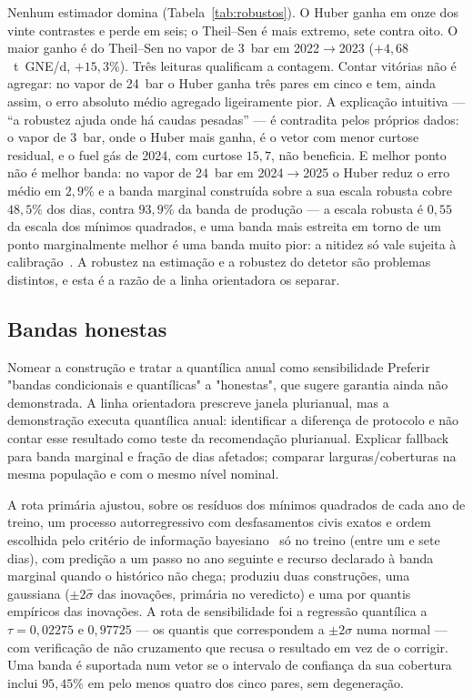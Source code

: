 Nenhum estimador domina (Tabela~\ref{tab:robustos}). O Huber ganha em onze
dos vinte contrastes e perde em seis; o Theil--Sen é mais extremo, sete
contra oito. O maior ganho é do Theil--Sen no vapor de 3~bar em
2022${\to}$2023 ($+4{,}68$~t~GNE/d, $+15{,}3\%$). Três leituras
qualificam a contagem. Contar vitórias não é agregar: no vapor de 24~bar o
Huber ganha três pares em cinco e tem, ainda assim, o erro absoluto médio
agregado ligeiramente pior. A explicação intuitiva --- ``a robustez ajuda
onde há caudas pesadas'' --- é contradita pelos próprios dados: o vapor de
3~bar, onde o Huber mais ganha, é o vetor com menor curtose residual, e o
fuel gás de 2024, com curtose $15{,}7$, não beneficia. E melhor ponto não é
melhor banda: no vapor de 24~bar em 2024${\to}$2025 o Huber reduz o erro
médio em $2{,}9\%$ e a banda marginal construída sobre a sua escala robusta
cobre $48{,}5\%$ dos dias, contra $93{,}9\%$ da banda de produção --- a
escala robusta é $0{,}55$ da escala dos mínimos quadrados, e uma banda mais
estreita em torno de um ponto marginalmente melhor é uma banda muito pior:
a nitidez só vale sujeita à calibração~\cite{Gneiting2007}.
A robustez na estimação e a robustez do detetor são problemas distintos, e
esta é a razão de a linha orientadora os separar.

\subsection{Bandas honestas}
\label{sec:demo-bandas}
{Nomear a construção e tratar a quantílica anual como sensibilidade}
{Preferir "bandas condicionais e quantílicas" a "honestas", que sugere
garantia ainda não demonstrada. A linha orientadora prescreve janela
plurianual, mas a demonstração executa quantílica anual: identificar a
diferença de protocolo e não contar esse resultado como teste da
recomendação plurianual. Explicar fallback para banda marginal e fração
de dias afetados; comparar larguras/coberturas na mesma população e
com o mesmo nível nominal.}%

A rota primária ajustou, sobre os resíduos dos mínimos quadrados de cada ano
de treino, um processo autorregressivo com desfasamentos civis exatos e
ordem escolhida pelo critério de informação bayesiano~\cite{Schwarz1978} só
no treino (entre um e sete dias), com predição a um passo no ano seguinte e recurso declarado à banda
marginal quando o histórico não chega; produziu duas construções, uma
gaussiana ($\pm 2\hat\sigma$ das inovações, primária no veredicto) e uma por
quantis empíricos das inovações. A rota de sensibilidade foi a regressão
quantílica a $\tau = 0{,}02275$ e $0{,}97725$ --- os quantis que
correspondem a $\pm 2\sigma$ numa normal --- com verificação de não
cruzamento que recusa o resultado em vez de o corrigir. Uma banda é
suportada num vetor se o intervalo de confiança da sua cobertura inclui
$95{,}45\%$ em pelo menos quatro dos cinco pares, sem degeneração.

